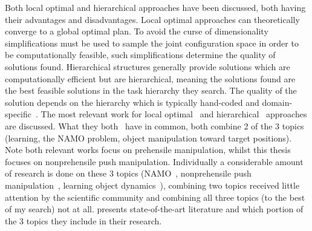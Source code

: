 Both local optimal and hierarchical approaches have been discussed, both having their advantages and disadvantages. Local optimal approaches can theoretically converge to a global optimal plan. To avoid the curse of dimensionality simplifications must be used to sample the joint configuration space in order to be computationally feasible, such simplifications determine the quality of solutions found. Hierarchical structures generally provide solutions which are computationally efficient but are hierarchical, meaning the solutions found are the best feasible solutions in the task hierarchy they search. The quality of the solution depends on the hierarchy which is typically hand-coded and domain-specific~\cite{vega-brown_asymptotically_2020}. The most relevant work for local optimal~\cite{sabbaghnovin_model_2021} and hierarchical~\cite{scholz_navigation_2016} approaches are discussed. What they both~\cite{sabbaghnovin_model_2021,scholz_navigation_2016} have in common, both combine 2 of the 3 topics (learning, the \ac{NAMO} problem, object manipulation toward target positions). Note both relevant works focus on prehensile manipulation, whilst this thesis focuses on nonprehensile push manipulation. Individually a considerable amount of research is done on these 3 topics (\ac{NAMO}~\cite{chen_fast_2018,elbanhawi_samplingbased_2014,ellis_navigation_2022,kingston_samplingbased_2018,lavalle_planning_2006,wang_affordancebased_2020}, nonprehensile push manipulation~\cite{arruda_uncertainty_2017,bauza_dataefficient_2018,mericli_pushmanipulation_2015,stuber_featurebased_2018,stuber_let_2020,toussaint_sequenceofconstraints_2022}, learning object dynamics~\cite{cong_selfadapting_2020,seegmiller_vehicle_2013}), combining two topics received little attention by the scientific community and combining all three topics (to the best of my search) not at all.  presents state-of-the-art literature and which portion of the 3 topics they include in their research.\bs


